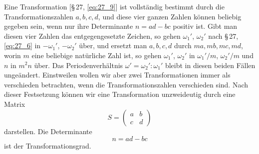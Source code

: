 \documentclass[12pt,a4paper]{article}
\begin{document}
\newpage

Eine Transformation [\S\,27, \eqref{eq:27_9}] ist vollst\"andig bestimmt durch die Transformationszahlen $a,b,c,d$, und diese vier ganzen Zahlen k\"onnen beliebig gegeben sein, wenn nur ihre Determinante $n=ad-bc$ positiv ist. Gibt man diesen vier Zahlen das entgegengesetzte Zeichen, so gehen $\omega_1'$, $\omega_2'$ nach \S\,27, \eqref{eq:27_6} in $-\omega_1'$, $-\omega_2'$ \"uber, und ersetzt man $a,b,c,d$ durch $ma,mb,mc,md$, worin $m$ eine beliebige nat\"urliche Zahl ist, so gehen $\omega_1'$, $\omega_2'$ in $\omega_1'/m$, $\omega_2'/m$ und $n$ in $m^2n$ \"uber. Das Periodenverh\"altnis $\omega'=\omega_2':\omega_1'$ bleibt in diesen beiden F\"allen unge\"andert. Einstweilen wollen wir aber zwei Transformationen immer als verschieden betrachten, wenn die Transformationszahlen verschieden sind. Nach dieser Festsetzung k\"onnen wir eine Transformation unzweideutig durch eine Matrix
\begin{equation}\label{eq:28_1}
S = \begin{pmatrix} a & b \\ c & d \end{pmatrix}
\end{equation}
darstellen. Die Determinante
\begin{equation}\label{eq:28_2}
n = ad-bc
\end{equation}
ist der Transformationsgrad.
\end{document}
